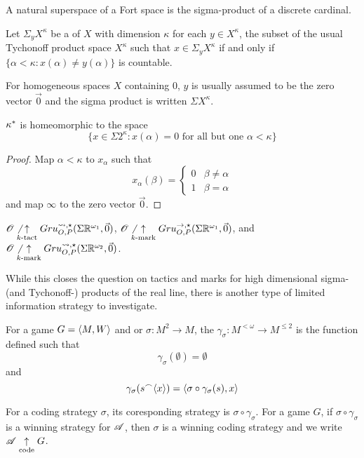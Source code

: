 A natural superspace of a Fort space is the sigma-product of a discrete
cardinal.

\begin{defn}
  Let $\Sigma_{y} X^\kappa$ be a  of $X$ with dimension
  $\kappa$ for each $y\in X^\kappa$, the subset of the usual Tychonoff
  product space $X^\kappa$ such that $x\in \Sigma_y X^\kappa$ if and only if
  $\{\alpha<\kappa : x(\alpha)\not=y(\alpha)\}$ is countable.

  For homogeneous spaces $X$ containing $0$, $y$ is usually assumed to be the
  zero vector $\vec 0$ and the sigma product is written $\Sigma X^\kappa$.
\end{defn}

\begin{prop}
  $\kappa^*$ is homeomorphic to the space
  \[
    \{
    x\in \Sigma 2^\kappa
      :
    x(\alpha)=0 \text{ for all but one } \alpha<\kappa
    \}
  \]
\end{prop}

\begin{proof}
  Map $\alpha<\kappa$ to $x_\alpha$ such that
  \[
    x_\alpha(\beta) =
    \left\{
      \begin{array}{ll}
        0 & \beta\not=\alpha \\
        1 & \beta=\alpha
      \end{array}
    \right.
  \]
  and map $\infty$ to the zero vector $\vec0$.
\end{proof}

\begin{cor}
  $\mathscr{O}\not\underset{k\text{-tact}}{\uparrow}Gru_{O,P}^{\leadsto,\star}(\Sigma\mathbb{R}^{\omega_1},\vec0)$,
  $\mathscr{O}\not\underset{k\text{-mark}}{\uparrow}Gru_{O,P}^{\to,\star}(\Sigma\mathbb{R}^{\omega_1},\vec0)$, and
  $\mathscr{O}\not\underset{k\text{-mark}}{\uparrow}Gru_{O,P}^{\leadsto,\star}(\Sigma\mathbb{R}^{\omega_2},\vec0)$.
\end{cor}

While this closes the question on tactics and marks for high dimensional
sigma- (and Tychonoff-) products of the real line, there is another type of
limited information strategy to investigate.

\begin{defn}
  For a game $G=\langle M,W\rangle$ and  or 
  $\sigma:M^2\to M$, the 
  $\gamma_\sigma: M^{<\omega}\to M^{\leq2}$ is the function defined such that
    \[
      \gamma_\sigma(\emptyset) = \emptyset
    \]
  and
    \[
      \gamma_\sigma(s{^\frown}\langle x\rangle) = \langle\sigma\circ\gamma_\sigma(s),x\rangle
    \]

  For a coding strategy $\sigma$, its coresponding strategy is
  $\sigma\circ\gamma_\sigma$. For a game $G$, if $\sigma\circ\gamma_\sigma$
  is a winning strategy for $\mathscr{A}$, then $\sigma$ is a winning coding
  strategy and we write $\mathscr{A} \underset{\text{code}}{\uparrow} G$.
\end{defn}

